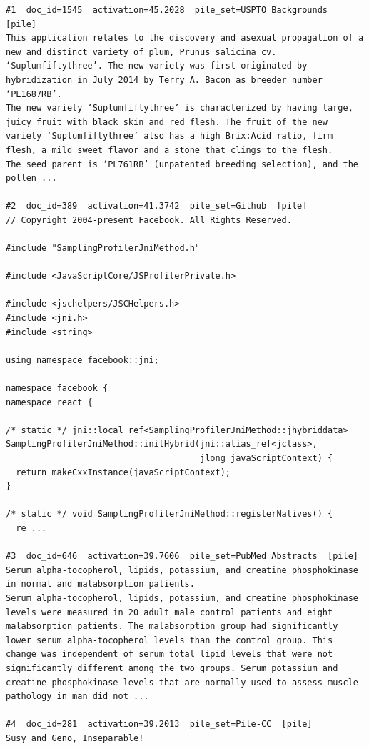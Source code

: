 \begin{verbatim}
#1  doc_id=1545  activation=45.2028  pile_set=USPTO Backgrounds  [pile]
This application relates to the discovery and asexual propagation of a new and distinct variety of plum, Prunus salicina cv. ‘Suplumfiftythree’. The new variety was first originated by hybridization in July 2014 by Terry A. Bacon as breeder number ‘PL1687RB’.
The new variety ‘Suplumfiftythree’ is characterized by having large, juicy fruit with black skin and red flesh. The fruit of the new variety ‘Suplumfiftythree’ also has a high Brix:Acid ratio, firm flesh, a mild sweet flavor and a stone that clings to the flesh.
The seed parent is ‘PL761RB’ (unpatented breeding selection), and the pollen ...

#2  doc_id=389  activation=41.3742  pile_set=Github  [pile]
// Copyright 2004-present Facebook. All Rights Reserved.

#include "SamplingProfilerJniMethod.h"

#include <JavaScriptCore/JSProfilerPrivate.h>

#include <jschelpers/JSCHelpers.h>
#include <jni.h>
#include <string>

using namespace facebook::jni;

namespace facebook {
namespace react {

/* static */ jni::local_ref<SamplingProfilerJniMethod::jhybriddata>
SamplingProfilerJniMethod::initHybrid(jni::alias_ref<jclass>,
                                      jlong javaScriptContext) {
  return makeCxxInstance(javaScriptContext);
}

/* static */ void SamplingProfilerJniMethod::registerNatives() {
  re ...

#3  doc_id=646  activation=39.7606  pile_set=PubMed Abstracts  [pile]
Serum alpha-tocopherol, lipids, potassium, and creatine phosphokinase in normal and malabsorption patients.
Serum alpha-tocopherol, lipids, potassium, and creatine phosphokinase levels were measured in 20 adult male control patients and eight malabsorption patients. The malabsorption group had significantly lower serum alpha-tocopherol levels than the control group. This change was independent of serum total lipid levels that were not significantly different among the two groups. Serum potassium and creatine phosphokinase levels that are normally used to assess muscle pathology in man did not ...

#4  doc_id=281  activation=39.2013  pile_set=Pile-CC  [pile]
Susy and Geno, Inseparable!


\end{verbatim}
